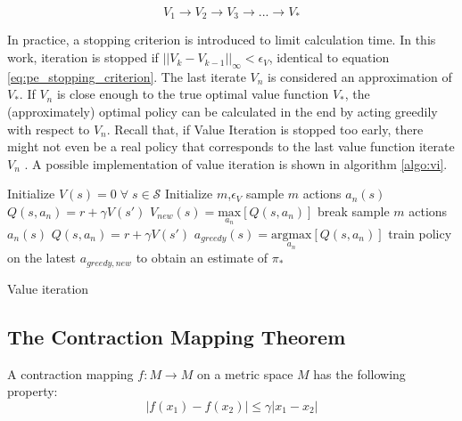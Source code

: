 \begin{equation*}
V_1 \longrightarrow V_2 \longrightarrow V_3 \longrightarrow ... \longrightarrow  V_*
\label{eq:vi_scheme}
\end{equation*}

In practice, a stopping criterion is introduced to limit calculation time. In this work, iteration is stopped if $||V_{k}-V_{k-1}||_\infty<\epsilon_V$, identical to equation \ref{eq:pe_stopping_criterion}. The last iterate $V_n$ is considered an approximation of $V_*$. If $V_n$ is close enough to the true optimal value function $V_*$, the (approximately) optimal policy can be calculated in the end by acting greedily with respect to $V_n$. Recall that, if Value Iteration is stopped too early, there might not even be a real policy that corresponds to the last value function iterate $V_n$ \cite[lecture~3]{Silver2015}. A possible implementation of value iteration is shown in algorithm \ref{algo:vi}.

\begin{algorithm}[hbt]
	\begin{algorithmic}[0] %
		\State Initialize $V(s) = 0 \; \forall \; s \in \mathcal{S}$
		\State Initialize $m$,\;$\epsilon_V$
		\State sample $m$ actions $a_n(s)$
		\State $Q(s,a_n) = r + \gamma V(s')$
		\EndFor		
		\State $V_{new}(s)=\underset{a_n}{\text{max}}[Q(s,a_n)]$
		\EndFor
		\State break
		\EndIf
		\EndWhile
		\State sample $m$ actions $a_n(s)$
		\State $Q(s,a_n) = r + \gamma V(s')$
		\EndFor
		\State $a_{greedy}(s)=\underset{a_n}{\text{argmax}}[Q(s,a_n)]$
		\EndFor
		\EndFunction
		\State train policy on the latest $a_{greedy,new}$ to obtain an estimate of $\pi_*$
		\EndFunction
	\end{algorithmic}	
	\caption{Value iteration}
	\label{algo:vi}
\end{algorithm}

\subsection{The Contraction Mapping Theorem}
\label{sec:contraction_mappings}
A contraction mapping $f: M \to M$ on a metric space $M$ has the following property:
\begin{equation}
|f(x_1)-f(x_2)| \leq \gamma |x_1-x_2|
\end{equation}


